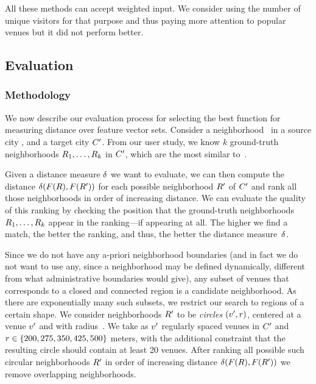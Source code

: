 \bigskip

All these methods can accept weighted input. We consider using the number of unique
visitors for that purpose and thus paying more attention to popular venues but it did not
perform better.

\subsection{Evaluation}
\label{sub:region-evaluation}

\subsubsection{Methodology}
We now describe our evaluation process for selecting the best function for
measuring distance over feature vector sets. 
Consider a neighborhood \region\ in a source city \city, and a target city
${C}'$.
From our user study, we know $k$ ground-truth neighborhoods
${R}_1,\ldots,{R}_k$ in ${C}'$, which are the most 
similar to~\region.

Given a distance measure ${\delta}$ we want to evaluate, 
we can then compute the distance
${\delta}({F}({R}),{F}({R}'))$ for each possible
neighborhood ${R}'$ of ${C}'$ and rank all those neighborhoods
in order of increasing distance. 
We can evaluate the quality of this ranking by checking the position
that the ground-truth neighborhoods ${R}_1,\ldots,{R}_k$
appear in the ranking---if appearing at all. 
The higher we find a match, the better the ranking, and thus, the
better the distance measure~${\delta}$.

Since we do not have any a-priori neighborhood boundaries (and in fact
we do not want to use any, since a neighborhood may be defined dynamically,
different from what administrative boundaries would give),
any subset of venues that corresponds to a closed and connected region
is a candidate neighborhood. 
As there are exponentially many such subsets, we restrict our
search to regions of a certain shape. 
We consider neighborhoods ${R}'$ to be \emph{circles}
$({v}',{r})$, centered at a venue ${v}'$ and with radius~\radius.
We take as ${v}'$ regularly spaced venues in ${C}'$ and ${r}\in\{200, 275,
350, 425, 500\}$ meters, with the additional constraint that the
resulting circle should contain at least 20 venues. 
After ranking all possible such circular neighborhoods ${R}'$ in
order of increasing distance ${\delta}({F}({R}),{F}({R}'))$
we remove overlapping neighborhoods.

